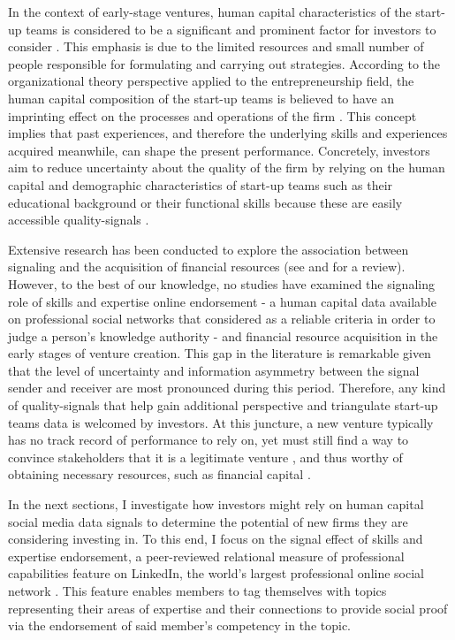 \documentclass[12pt]{article}
\begin{document}
In the context of early-stage ventures, human capital characteristics of the start-up teams is considered to be a significant and prominent factor for investors to consider \citep{beckman2007early, ko2018signaling, matusik2008values}. This emphasis is due to the limited resources and small number of people responsible for formulating and carrying out strategies. According to the organizational theory perspective applied to the entrepreneurship field, the human capital composition of the start-up teams is believed to have an imprinting effect on the processes and operations of the firm \citep{packalen2007complementing}. This concept implies that past experiences, and therefore the underlying skills and experiences acquired meanwhile, can shape the present performance. Concretely, investors aim to reduce uncertainty about the quality of the firm by relying on the human capital and demographic characteristics of start-up teams such as their educational background or their functional skills because these are easily accessible quality-signals \citep{colombo2005founders, beckman2007early, eddleston2016you, plummer2016better}.

Extensive research has been conducted to explore the association between signaling and the acquisition of financial resources (see \citep{connelly2011signaling} and \citet{colombo2021use} for a review). However, to the best of our knowledge, no studies have examined the signaling role of skills and expertise online endorsement - a human capital data available on professional social networks that considered as a reliable criteria in order to judge a person’s knowledge authority \citep{rapanta2017linkedin} - and financial resource acquisition in the early stages of venture creation. This gap in the literature is remarkable given that the level of uncertainty \citep{matusik2008values} and information asymmetry between the signal sender and receiver \citep{spence2002signaling} are most pronounced during this period. Therefore, any kind of quality-signals that help gain additional perspective and triangulate start-up teams data is welcomed by investors. At this juncture, a new venture typically has no track record of performance to rely on, yet must still find a way to convince stakeholders that it is a legitimate venture \citep{becker2015new}, and thus worthy of obtaining necessary resources, such as financial capital \citep{ko2018signaling}.

In the next sections, I investigate how investors might rely on human capital social media data signals to determine the potential of new firms they are considering investing in. To this end, I focus on the signal effect of skills and expertise endorsement, a peer-reviewed relational measure of professional capabilities feature on LinkedIn, the world's largest professional online social network \citep{wu2018analysis}. This feature enables members to tag themselves with topics representing their areas of expertise and their connections to provide social proof via the endorsement of said member's competency in the topic.
\end{document}
